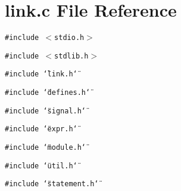 \section{link.c File Reference}
\label{link_8c}
{\tt \#include $<$stdio.h$>$}\par
{\tt \#include $<$stdlib.h$>$}\par
{\tt \#include \char`\"{}link.h\char`\"{}}\par
{\tt \#include \char`\"{}defines.h\char`\"{}}\par
{\tt \#include \char`\"{}signal.h\char`\"{}}\par
{\tt \#include \char`\"{}expr.h\char`\"{}}\par
{\tt \#include \char`\"{}module.h\char`\"{}}\par
{\tt \#include \char`\"{}util.h\char`\"{}}\par
{\tt \#include \char`\"{}statement.h\char`\"{}}\par
